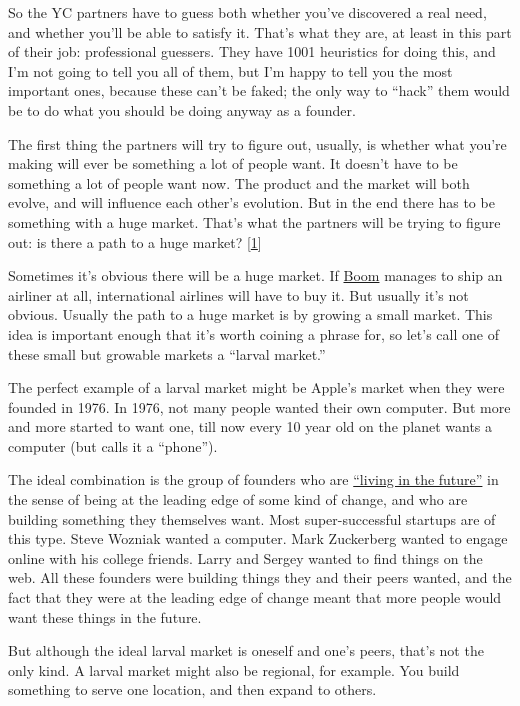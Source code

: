 So the YC partners have to guess both whether you've discovered a real
need, and whether you'll be able to satisfy it. That's what they are, at
least in this part of their job: professional guessers. They have 1001
heuristics for doing this, and I'm not going to tell you all of them,
but I'm happy to tell you the most important ones, because these can't
be faked; the only way to ``hack'' them would be to do what you should
be doing anyway as a founder.

The first thing the partners will try to figure out, usually, is whether
what you're making will ever be something a lot of people want. It
doesn't have to be something a lot of people want now. The product and
the market will both evolve, and will influence each other's evolution.
But in the end there has to be something with a huge market. That's what
the partners will be trying to figure out: is there a path to a huge
market? {[}\hyperref[f1n]{1}{]}

Sometimes it's obvious there will be a huge market. If
\href{https://boomsupersonic.com/}{Boom} manages to ship an airliner at
all, international airlines will have to buy it. But usually it's not
obvious. Usually the path to a huge market is by growing a small market.
This idea is important enough that it's worth coining a phrase for, so
let's call one of these small but growable markets a ``larval market.''

The perfect example of a larval market might be Apple's market when they
were founded in 1976. In 1976, not many people wanted their own
computer. But more and more started to want one, till now every 10 year
old on the planet wants a computer (but calls it a ``phone'').

The ideal combination is the group of founders who are
\href{startupideas.html}{``living in the future''} in the sense of being
at the leading edge of some kind of change, and who are building
something they themselves want. Most super-successful startups are of
this type. Steve Wozniak wanted a computer. Mark Zuckerberg wanted to
engage online with his college friends. Larry and Sergey wanted to find
things on the web. All these founders were building things they and
their peers wanted, and the fact that they were at the leading edge of
change meant that more people would want these things in the future.

But although the ideal larval market is oneself and one's peers, that's
not the only kind. A larval market might also be regional, for example.
You build something to serve one location, and then expand to others.

